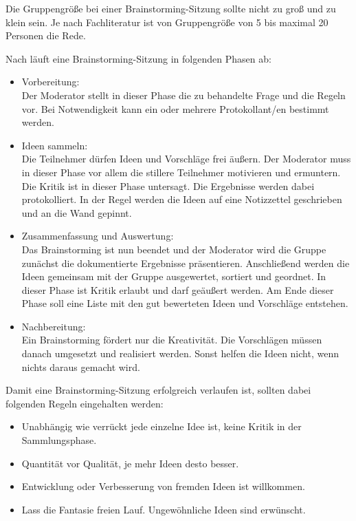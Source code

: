 Die Gruppengröße bei einer Brainstorming-Sitzung sollte nicht zu groß und zu klein sein.  \glqq Je nach Fachliteratur ist von Gruppengröße von 5 bis maximal 20 Personen die Rede\grqq{}. \cite{Pas2012}\bigskip

Nach \cite{Rei2007} läuft eine Brainstorming-Sitzung in folgenden Phasen ab: 

\begin{itemize} 
\item Vorbereitung:\\
Der Moderator stellt in dieser Phase die zu behandelte Frage und die Regeln vor. Bei Notwendigkeit kann ein oder mehrere Protokollant/en bestimmt werden.

\item Ideen sammeln:\\
Die Teilnehmer dürfen Ideen und Vorschläge frei äußern. Der Moderator muss in dieser Phase vor allem die stillere Teilnehmer motivieren und ermuntern. Die Kritik ist in dieser Phase untersagt. Die Ergebnisse werden dabei protokolliert. In der Regel werden die Ideen auf eine Notizzettel geschrieben und an die Wand gepinnt.

\item Zusammenfassung und Auswertung:\\
Das Brainstorming ist nun beendet und der Moderator wird die Gruppe zunächst die dokumentierte Ergebnisse präsentieren. Anschließend werden die Ideen gemeinsam mit der Gruppe ausgewertet, sortiert und geordnet. In dieser Phase ist Kritik erlaubt und darf geäußert werden. Am Ende dieser Phase soll eine Liste mit den gut bewerteten Ideen und Vorschläge entstehen.

\item Nachbereitung:\\
Ein Brainstorming fördert nur die Kreativität. Die Vorschlägen müssen danach umgesetzt und realisiert werden. Sonst helfen die Ideen nicht, wenn nichts daraus gemacht wird.
\end{itemize}

Damit eine Brainstorming-Sitzung erfolgreich verlaufen ist, sollten dabei folgenden Regeln eingehalten werden:

\begin{itemize} 
\item Unabhängig wie verrückt jede einzelne Idee ist, keine Kritik in der Sammlungsphase.
\item Quantität vor Qualität, je mehr Ideen desto besser.
\item Entwicklung oder Verbesserung von fremden Ideen ist willkommen.
\item Lass die Fantasie freien Lauf. Ungewöhnliche Ideen sind erwünscht.
\end{itemize}

